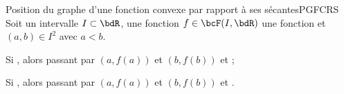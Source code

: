 \documentclass[a4paper,french,bookmarks]{article}
\begin{document}
\begin{lemma}{Position du graphe d'une fonction convexe par rapport à ses sécantes}{PGFCRS}
    Soit un intervalle $I \subset \bdR$, une fonction $f \in \bcF(I, \bdR)$ une fonction et $(a, b) \in I^2$ avec $a < b$.
    
    \begin{enumerate}
        \ithand Si , alors  passant par $\left(a, f(a)\right)$ et $\left(b, f(b)\right)$  et  ;
        
        \ithand Si , alors  passant par $\left(a, f(a)\right)$ et $\left(b, f(b)\right)$  et .
    \end{enumerate}
\end{lemma}
\end{document}
